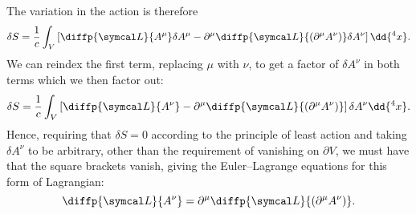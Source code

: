 The variation in the action is therefore
\begin{equation}
    \delta S = \frac{1}{c} \int_V \left[ \diffp{\lagrangianDensity}{A^\mu} \delta A^\mu - \partial^\mu \diffp{\lagrangianDensity}{(\partial^\mu A^\nu)} \delta A^\nu \right] \dd{^4x}.
\end{equation}
We can reindex the first term, replacing \(\mu\) with \(\nu\), to get a factor of \(\delta A^\nu\) in both terms which we then factor out:
\begin{equation}
    \delta S = \frac{1}{c} \int_V \left[ \diffp{\lagrangianDensity}{A^\nu} - \partial^\mu \diffp{\lagrangianDensity}{(\partial^\mu A^\nu)} \right] \delta A^\nu \dd{^4x}.
\end{equation}
Hence, requiring that \(\delta S = 0\) according to the principle of least action and taking \(\delta A^\nu\) to be arbitrary, other than the requirement of vanishing on \(\partial V\), we must have that the square brackets vanish, giving the Euler--Lagrange equations for this form of Lagrangian:
\begin{equation}
    \diffp{\lagrangianDensity}{A^\nu} = \partial^\mu \diffp{\lagrangianDensity}{(\partial^\mu A^\nu)}.
\end{equation}

